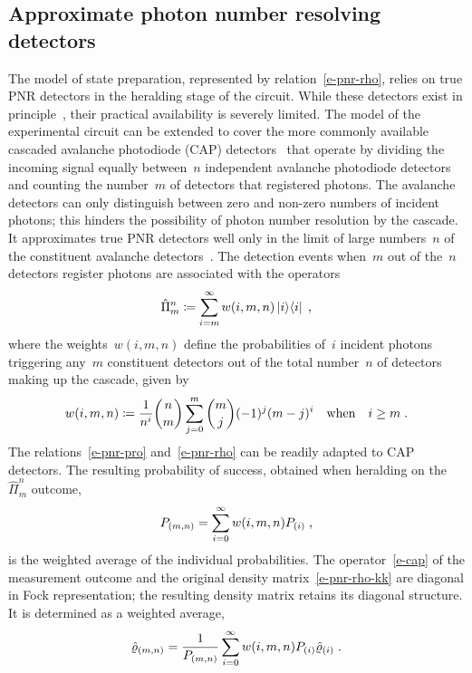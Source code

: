 \documentclass{optica-article}
\begin{document}
\subsection*{Approximate photon number resolving detectors}

The model of state preparation, represented by relation~\eqref{e-pnr-rho}, relies on true PNR detectors in the heralding stage of the circuit. While these detectors exist in principle~\cite{hopker2019,endo2021,endo2024}, their practical availability is severely limited. The model of the experimental circuit can be extended to cover the more commonly available cascaded avalanche photodiode (CAP) detectors~\cite{hlousek2019,grygar2022,hlousek2024,ercolano2024} that operate by dividing the incoming signal equally between~$n$ independent avalanche photodiode detectors and counting the number~$m$ of detectors that registered photons. The avalanche detectors can only distinguish between zero and non-zero numbers of incident photons; this hinders the possibility of photon number resolution by the cascade. It approximates true PNR detectors well only in the limit of large numbers~$n$ of the constituent avalanche detectors~\cite{provaznik2020}. The detection events when~$m$ out of the~$n$ detectors register photons are associated with the operators~\cite{paul1996}
%
\begin{equation}\label{e-cap}
  \hat{\Pi}_{m}^{n} 
    \coloneqq \sum_{i = m}^{\infty} w(i, m, n) \ketbra{i}{i} \Qc
\end{equation}
%
where the weights~$w(i, m, n)$ define the probabilities of~$i$ incident photons triggering any~$m$ constituent detectors out of the total number~$n$ of detectors making up the cascade, given by
%
\begin{equation}\label{e-cap-w}
  w(i, m, n) \coloneqq 
    \frac{1}{n^{i}} \binom{n}{m} \sum_{j = 0}^{m} \binom{m}{j} (-1)^{j} (m - j)^{i} 
    \quad\text{when}\quad i \geq m \;\text{.}
\end{equation} 
%
The relations~\eqref{e-pnr-pro} and~\eqref{e-pnr-rho} can be readily adapted to CAP detectors. The resulting probability of success, obtained when heralding on the~$\hat{\Pi}_{m}^{n}$ outcome, 
%
\begin{equation}\label{e-cap-pro}
  P_{(m, n)} = \sum_{i = 0}^{\infty} w(i, m, n) P_{(i)} \;\text{,}
\end{equation}
%
is the weighted average of the individual probabilities. The operator~\eqref{e-cap} of the measurement outcome and the original density matrix~\eqref{e-pnr-rho-kk} are diagonal in Fock representation; the resulting density matrix retains its diagonal structure. It is determined as a weighted average,
%
\begin{equation}\label{e-cap-rho-kk}
  \hat{\varrho}_{(m, n)} =
    \frac{1}{ P_{(m,n)} }
    \sum_{i = 0}^{\infty} w(i, m, n) P_{(i)} \hat{\varrho}_{(i)}
  \;\text{.}
\end{equation}
\end{document}
